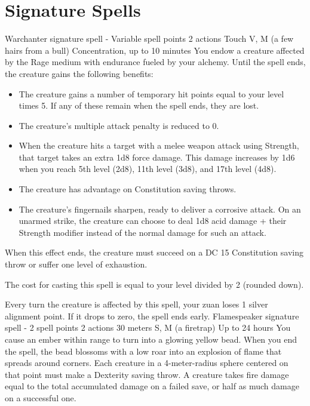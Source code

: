 \section{Signature Spells} \label{sec::signaturespells}
    {Warchanter signature spell - Variable spell points}
    {2 actions}
    {Touch}
    {V, M (a few hairs from a bull)}
    {Concentration, up to 10 minutes}
    You endow a creature affected by the Rage medium with endurance fueled by your alchemy.
    Until the spell ends, the creature gains the following benefits:

    \begin{itemize}
        \item The creature gains a number of temporary hit points equal to your level times 5.
        If any of these remain when the spell ends, they are lost.
        \item The creature's multiple attack penalty is reduced to 0.
        \item When the creature hits a target with a melee weapon attack using Strength, that target takes an extra 1d8 force damage.
        This damage increases by 1d6 when you reach 5th level (2d8), 11th level (3d8), and 17th level (4d8).
        \item The creature has advantage on Constitution saving throws.
        \item The creature's fingernails sharpen, ready to deliver a corrosive attack.
        On an unarmed strike, the creature can choose to deal 1d8 acid damage + their Strength modifier instead of the normal damage for such an attack.
    \end{itemize}

    When this effect ends, the creature must succeed on a DC 15 Constitution saving throw or suffer one level of exhaustion.

    The cost for casting this spell is equal to your level divided by 2 (rounded down).

    Every turn the creature is affected by this spell, your zuan loses 1 silver alignment point.
    If it drops to zero, the spell ends early.
    {Flamespeaker signature spell - 2 spell points}
    {2 actions}
    {30 meters}
    {S, M (a firetrap)}
    {Up to 24 hours}
    You cause an ember within range to turn into a glowing yellow bead.
    When you end the spell, the bead blossoms with a low roar into an explosion of flame that spreads around corners.
    Each creature in a 4-meter-radius sphere centered on that point must make a Dexterity saving throw.
    A creature takes fire damage equal to the total accumulated damage on a failed save, or half as much damage on a successful one.

